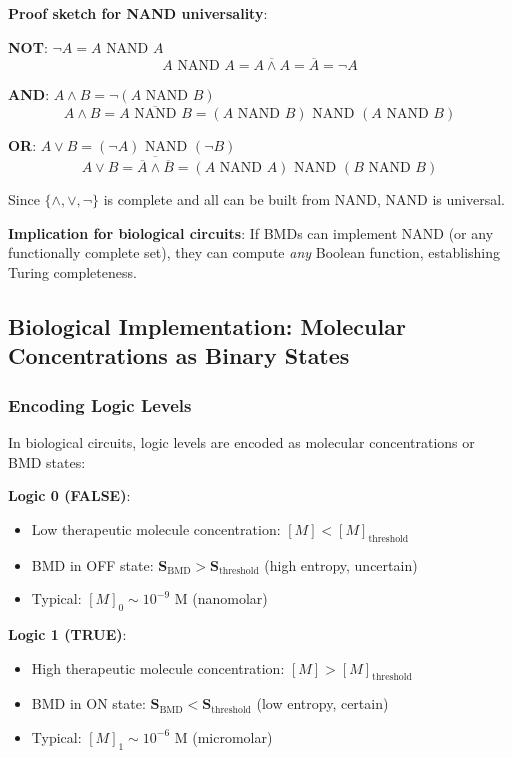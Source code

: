 \documentclass[11pt,a4paper]{article}
\begin{document}
\textbf{Proof sketch for NAND universality}:

\textbf{NOT}: $\neg A = A \text{ NAND } A$
\begin{equation}
A \text{ NAND } A = \overline{A \land A} = \overline{A} = \neg A
\end{equation}

\textbf{AND}: $A \land B = \neg(A \text{ NAND } B)$
\begin{equation}
A \land B = \overline{A \text{ NAND } B} = (A \text{ NAND } B) \text{ NAND } (A \text{ NAND } B)
\end{equation}

\textbf{OR}: $A \lor B = (\neg A) \text{ NAND } (\neg B)$
\begin{equation}
A \lor B = \overline{\overline{A} \land \overline{B}} = (A \text{ NAND } A) \text{ NAND } (B \text{ NAND } B)
\end{equation}

Since $\{\land, \lor, \neg\}$ is complete and all can be built from NAND, NAND is universal.

\textbf{Implication for biological circuits}: If BMDs can implement NAND (or any functionally complete set), they can compute \textit{any} Boolean function, establishing Turing completeness.

\subsection{Biological Implementation: Molecular Concentrations as Binary States}

\subsubsection{Encoding Logic Levels}

In biological circuits, logic levels are encoded as molecular concentrations or BMD states:

\textbf{Logic 0 (FALSE)}:
\begin{itemize}
\item Low therapeutic molecule concentration: $[M] < [M]_{\text{threshold}}$
\item BMD in OFF state: $\mathbf{S}_{\text{BMD}} > \mathbf{S}_{\text{threshold}}$ (high entropy, uncertain)
\item Typical: $[M]_0 \sim 10^{-9}$ M (nanomolar)
\end{itemize}

\textbf{Logic 1 (TRUE)}:
\begin{itemize}
\item High therapeutic molecule concentration: $[M] > [M]_{\text{threshold}}$
\item BMD in ON state: $\mathbf{S}_{\text{BMD}} < \mathbf{S}_{\text{threshold}}$ (low entropy, certain)
\item Typical: $[M]_1 \sim 10^{-6}$ M (micromolar)
\end{itemize}
\end{document}
